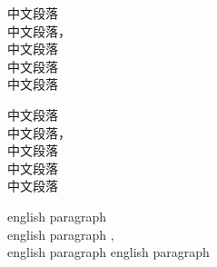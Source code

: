 \documentclass{article}
\begin{document}
\parindent=0pt

\textcite{Aaa_2018}

\textcite{Aaa_2018a}


{
中文段落\cite{Aaa_2018,Aaa_2018a}\cite{Aaa_2021,Aaa_2018}\\
中文段落\textcite{Aaa_2018,Aaa_2018a}，\textcite{Aaa_2021,Aaa_2018}\\
中文段落\cite{Aaa_2018,Bbb_2019}\parencite{Aaa_2018,Bbb_2019}\\
中文段落\citet{Aaa_2018}\citep{Bbb_2019}\\
中文段落\citet{陈晋镳1980}\citep{初景利2004}
}
\bigskip

{
中文段落\cite{Aaa_2018,Aaa_2018a}\cite{Aaa_2021,Aaa_2018}\\
中文段落\textcite{Aaa_2018,Aaa_2018a}，\textcite{Aaa_2021,Aaa_2018}\\
中文段落\cite{Aaa_2018,Bbb_2019}\parencite{Aaa_2018,Bbb_2019}\\
中文段落\citet{Aaa_2018}\citep{Bbb_2019}\\
中文段落\citet{陈晋镳1980}\citep{初景利2004}
}
\bigskip


{
english paragraph \cite{Aaa_2018,Aaa_2018a}\cite{Aaa_2021,Aaa_2018}\\
english paragraph \textcite{Aaa_2018,Aaa_2018a},  \textcite{Aaa_2021,Aaa_2018} \\
english paragraph \cite{Aaa_2018,Bbb_2019}\parencite{Aaa_2018,Bbb_2019}
english paragraph \citet{陈晋镳1980}\citep{初景利2004}
}



\printbibliography
\end{document}
